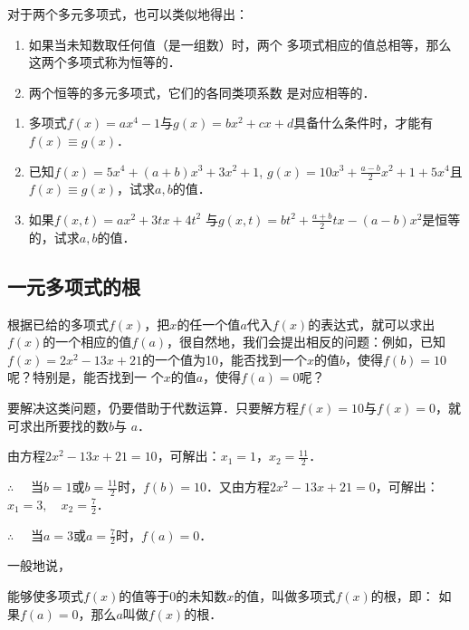 对于两个多元多项式，也可以类似地得出：
\begin{blk}{}
    \begin{enumerate}
        \item 如果当未知数取任何值（是一组数）时，两个
        多项式相应的值总相等，那么这两个多项式称为恒等的．
        \item 
        两个恒等的多元多项式，它们的各同类项系数
        是对应相等的．
    \end{enumerate}
\end{blk}

\begin{ex}
    \begin{enumerate}
        \item 多项式$f(x)=ax^4-1$与$g(x)=bx^2+cx+d$具备什么条件时，才能有$f(x)\equiv g(x)$．
        \item 已知$f(x)=5x^4+(a+b)x^3+3x^2+1$, $g(x)=10x^3+\frac{a-b}{2}x^2+1+5x^4$且$f(x)\equiv g(x)$，试求$a,b$的值．
        \item 如果$f(x,t)=ax^2+3tx+4t^2$ 与$g(x,t)=bt^2+\frac{a+b}{2}tx-(a-b)x^2$是恒等的，试求$a,b$的值．
    \end{enumerate}
\end{ex}

\subsection{一元多项式的根}

根据已给的多项式$f(x)$，把$x$的任一个值$a$代入$f(x)$的表达式，就可以求出$f(x)$的一个相应的值$f(a)$，很自然地，我们会提出相反的问题：例如，已知$f(x)=2x^2-13x+21$的一个值为10，能否找到一个$x$的值$b$，使得$f(b)=10$呢？特别是，能否找到一
个$x$的值$a$，使得$f(a)=0$呢？

要解决这类问题，仍要借助于代数运算．只要解方程$f(x)=10$与$f(x)=0$，就可求出所要找的数$b$与
$a$．

由方程$2x^2-13x+21=10$，可解出：$x_1=1$，$x_2=\frac{11}{2}$．

$\therefore\quad $ 当$b=1$或$b=\frac{11}{2}$时，$f(b)=10$．又由方程$2x^2-13x+21=0$，可解出：$x_1=3,\quad x_2=\frac{7}{2}$．

$\therefore\quad $ 当$a=3$或$a=\frac{7}{2}$时，$f(a)=0$．

一般地说，
\begin{blk}{}
    能够使多项式$f(x)$的值等于0的未知数$x$的值，叫做多项式$f(x)$的根，即：
如果$f(a)=0$，那么$a$叫做$f(x)$的根．
\end{blk}


